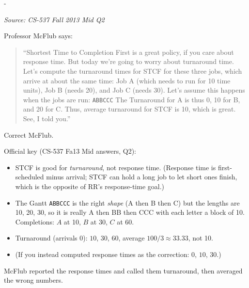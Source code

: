 \documentclass[11pt,a4paper]{article}
\makeatletter
\newcommand{\keepspace}[1]{\par\penalty-100\begingroup
  \setlength{\dimen@}{#1}\dimen@ii\pagegoal\advance\dimen@ii-\pagetotal
  \ifdim\dimen@>\dimen@ii\ifdim\dimen@ii>\z@\vfil\fi\break\fi\endgroup}
\newcounter{qn}[section]
\newenvironment{Qn}[4]{%
  \refstepcounter{qn}\keepspace{7\baselineskip}%
  \begin{tcolorbox}[qboxstyle, title={Q\thesection.\theqn\ \ [#1 \textbar\ #2]\ \ #4}]%
  {\footnotesize\color{g3}\textit{Source: #3}}\par\smallskip%
}{%
  \end{tcolorbox}%
}
\newenvironment{Sol}{%
  \begin{tcolorbox}[sboxstyle, title={Solution}]%
}{%
  \end{tcolorbox}\vspace{0.35em}%
}
\makeatother
\begin{document}
\begin{Qn}{Hard}{Lect 5--6}{CS-537 Fall 2013 Mid Q2}{McFlub's STCF turnaround arithmetic}
Professor McFlub says:
\begin{quote}
``Shortest Time to Completion First is a great policy, if you care about response time. But today we're going to worry about turnaround time. Let's compute the turnaround times for STCF for these three jobs, which arrive at about the same time: Job A (which needs to run for 10 time units), Job B (needs 20), and Job C (needs 30). Let's assume this happens when the jobs are run:
\texttt{ABBCCC}
The Turnaround for A is thus 0, 10 for B, and 20 for C. Thus, average turnaround for STCF is 10, which is great. See, I told you.''
\end{quote}
Correct McFlub.
\end{Qn}
\begin{Sol}
Official key (CS-537 Fa13 Mid answers, Q2):
\begin{itemize}
  \item STCF is good for \emph{turnaround}, not response time. (Response time is first-scheduled minus arrival; STCF can hold a long job to let short ones finish, which is the opposite of RR's response-time goal.)
  \item The Gantt \texttt{ABBCCC} is the right \emph{shape} (A then B then C) but the lengths are 10, 20, 30, so it is really A then BB then CCC with each letter a block of 10. Completions: $A$ at 10, $B$ at 30, $C$ at 60.
  \item Turnaround (arrivals 0): $10$, $30$, $60$, average $100/3 \approx 33.33$, not 10.
  \item (If you instead computed response times as the correction: $0$, $10$, $30$.)
\end{itemize}
McFlub reported the response times and called them turnaround, then averaged the wrong numbers.
\end{Sol}
\end{document}
